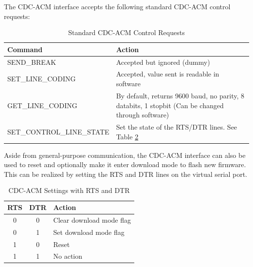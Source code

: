 \documentclass[main\_\_EN.tex]{subfiles}
\begin{document}
The CDC-ACM interface accepts the following standard CDC-ACM control requests:

\begin{table}[H]
    \centering
    \caption{Standard CDC-ACM Control Requests}
    \label{tab:usbserialjtag-standard-cdc-acm-requests}

    \begin{tabular}{ | l | p{10cm} | }
    \hline
        \rowcolor{lightgray}
        \textbf{Command} & \textbf{Action} \\\hline

        SEND\_BREAK & Accepted but ignored (dummy) \\\hline
        SET\_LINE\_CODING & Accepted, value sent is readable in software \\\hline
        GET\_LINE\_CODING & By default, returns 9600 baud, no parity, 8 databits, 1 stopbit (Can be changed through software) \\\hline
        SET\_CONTROL\_LINE\_STATE & Set the state of the RTS/DTR lines. See Table \ref{tab:usbserialjtag-cdc-acm-settings-with-rts-and-dtr} \\\hline
    \end{tabular}
\end{table}

Aside from general-purpose communication, the CDC-ACM interface can also be used to reset \chipname{} and optionally make it enter download mode to flash new firmware. This can be realized by setting the RTS and DTR lines on the virtual serial port.

\begin{table}[H] 
    \centering
    \caption{CDC-ACM Settings with RTS and DTR}
    \label{tab:usbserialjtag-cdc-acm-settings-with-rts-and-dtr}
    
    \begin{tabular}{ | c | c | p{5cm} | }
    \hline
        \rowcolor{lightgray}
        \textbf{RTS} & \textbf{DTR} & \textbf{Action}\\\hline
        
        0 & 0 & Clear download mode flag  \\\hline
        0 & 1 & Set download mode flag  \\\hline
        1 & 0 & Reset \chipname{}  \\\hline
        1 & 1 & No action \\\hline
    \end{tabular}
\end{table}
\end{document}
